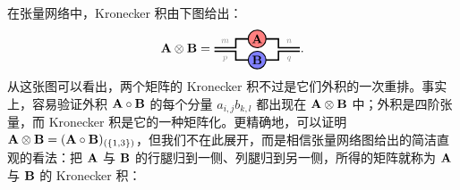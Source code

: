 在张量网络中，Kronecker 积由下图给出：
\begin{align}
    \Ab\kron\Bb = 
\begin{tikzpicture}[baseline=-0.5ex]
    \tikzset{tensor/.style = {minimum size = 0.5cm,shape = circle,thick,draw=black,inner sep = 0pt}, edge/.style   = {thick,line width=.4mm}}
    \def\x{0}
    \def\y{0}
    \node[tensor,fill=red!50!white] (A) at (\x,\y+0.3){$\Ab$};
    \node[tensor,fill=blue!50!white] (B) at (\x,\y-0.3){$\Bb$};
    \draw[edge] (\x-0.25,\y+0.3) -- (\x-0.6,\y+0.3) -- (\x-0.6,\y+0.05)   -- (\x-1.2,\y+0.05) node [midway,above] {\scalebox{0.7}{\dimcolor{$m$}}};
    \draw[edge] (\x-0.25,\y-0.3) -- (\x-0.6,\y-0.3) -- (\x-0.6,\y-0.05) -- (\x-1.2,\y-0.05) node [midway,below] {\scalebox{0.7}{\dimcolor{$p$}}};
    \draw[edge] (\x+0.25,\y+0.3) -- (\x+0.6,\y+0.3) -- (\x+0.6,\y+0.05) -- (\x+1.2,\y+0.05) node [midway,above] {\scalebox{0.7}{\dimcolor{$n$}}};
    \draw[edge] (\x+0.25,\y-0.3) -- (\x+0.6,\y-0.3) -- (\x+0.6,\y-0.05) -- (\x+1.2,\y-0.05) node [midway,below] {\scalebox{0.7}{\dimcolor{$q$}}};
\end{tikzpicture}.
\end{align}
从这张图可以看出，两个矩阵的 Kronecker 积不过是它们外积的一次重排。事实上，容易验证外积 $\mathbf{A} \circ \mathbf{B}$ 的每个分量 $a_{i,j}b_{k,l}$ 都出现在 $\mathbf{A} \otimes \mathbf{B}$ 中；外积是四阶张量，而 Kronecker 积是它的一种矩阵化。更精确地，可以证明 $\mathbf{A} \otimes \mathbf{B} = (\mathbf{A} \circ \mathbf{B})_{(\{1,3\})}$，但我们不在此展开，而是相信张量网络图给出的简洁直观的看法：把 $\mathbf{A}$ 与 $\mathbf{B}$ 的行腿归到一侧、列腿归到另一侧，所得的矩阵就称为 $\mathbf{A}$ 与 $\mathbf{B}$ 的 Kronecker 积：
